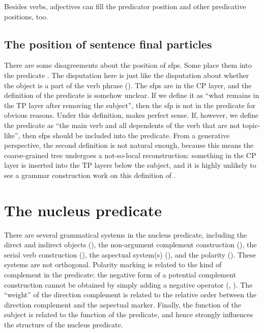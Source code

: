 \documentclass[../main.tex]{subfiles}
\begin{document}
Besides verbs, adjectives can fill the predicator position and other predicative positions, too.  %

\subsection{The position of sentence final particles}

There are some disagreements about the position of \ac{sfp}s. 
Some place them into the predicate \citep[]{zhudexigrammar}. 
The disputation here is just like the disputation about whether the object is a part of the verb phrase 
().
The \ac{sfp}s are in the CP layer, and the definition of the predicate is somehow unclear.
If we define it as ``what remains in the TP layer after removing the subject'',
then the \ac{sfp} is not in the predicate for obvious reasons.
Under this definition,  makes perfect sense.
If, however, we define the predicate as 
``the main verb and all dependents of the verb that are not topic-like'',
then \ac{sfp}s should be included into the predicate.
From a generative perspective, the second definition is not natural enough,
because this means the coarse-grained tree undergoes a not-so-local reconstruction: 
something in the CP layer is inserted into the TP layers below the subject,
and it is highly unlikely to see a grammar construction work on this definition of .

\section{The nucleus predicate}


There are several grammatical systems in the nucleus predicate, including 
the direct and indirect objects (),
the non-argument complement construction (),
the serial verb construction (),
the aspectual system(s) (),
and the polarity (). 
These systems are not orthogonal. 
Polarity marking is related to the kind of complement in the predicate:
the negative form of a potential complement construction cannot be obtained by simply adding a negative operator 
(, ). %
The ``weight'' of the direction complement is related to the relative order 
between the direction complement and the aspectual marker. %
Finally, the function of the subject is related to the function of the predicate,
and hence strongly influences the structure of the nucleus predicate. 
\end{document}
